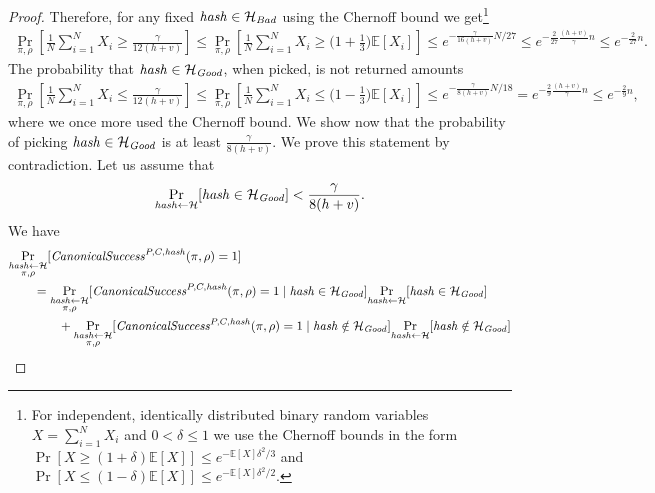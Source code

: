 \begin{proof}
Therefore, for any fixed $\operatorname{\mathit{hash}} \in \mathcal{H}_{\mathit{Bad}}$ using the Chernoff bound we get\footnote{For independent, identically distributed binary
random variables $X = \sum_{i=1}^N X_i$ and $0 < \delta \leq 1$ we use the Chernoff bounds in the form
$\Pr[X \geq (1+\delta) \mathbb{E}[X]] \leq e^{- \mathbb{E}[X] \delta^2/3}$ and
$\Pr[X \leq (1-\delta) \mathbb{E}[X]] \leq e^{- \mathbb{E}[X] \delta^2/2}$.}
\begin{align*}
  \underset{\pi,\rho}{\Pr} \left[\frac{1}{N} \sum_{i=1}^{N} X_i \geq \frac{\gamma}{12(h+v)} \right] \leq
  \underset{\pi, \rho}{\Pr}\left[\frac{1}{N} \sum_{i=1}^{N} X_i \geq \bigl(1 + \frac{1}{3}\bigr) \mathbb{E}[X_i]\right] \leq
  e^{-{\frac{\gamma}{16(h+v)}} N / 27} \leq e^{-\frac{2}{27}\frac{(h+v)}{\gamma}n} \leq e^{-\frac{2}{27}n}.
\end{align*}
%
The probability that $\operatorname{\mathit{hash}} \in \mathcal{H}_{\mathit{Good}}$, when picked, is not returned amounts
\begin{align*}
  \underset{\pi, \rho}{\Pr}\left[\frac{1}{N} \sum_{i=1}^{N} X_i \leq \frac{\gamma}{12(h+v)}\right] \leq
  \underset{\pi, \rho}{\Pr}\left[\frac{1}{N} \sum_{i=1}^{N} X_i \leq \bigl(1 - \frac{1}{3}\bigr)\mathbb{E}[X_i]\right]
  \leq e^{-{\frac{\gamma}{8(h+v)}} N / 18} = e^{-\frac{2}{9} \frac{(h+v)}{\gamma}n} \leq e^{-\frac{2}{9}n},
\end{align*}
where we once more used the Chernoff bound.
We show now that the probability of picking $\operatorname{\mathit{hash}} \in \mathcal{H}_{\mathit{Good}}$ is at least $\frac{\gamma}{8(h+v)}$.
We prove this statement by contradiction. Let us assume that
\begin{align}
  \label{ass:hash_max_prob}
\underset{\operatorname{\mathit{hash}} \leftarrow \mathcal{H}}{\Pr}[\operatorname{\mathit{hash}} \in \mathcal{H}_{\mathit{Good}}] < \frac{\gamma}{8(h+v)}.
\end{align}
We have
\begin{align*}
  &\underset{\substack{\hash \leftarrow \cH \\ \pi, \rho}}{\Pr}[\CanonicalSuccess^{P,C,\hash}(\pi, \rho) = 1] \\
  &\IndI = \underset{\substack{ \hash \leftarrow \cH \\ \pi, \rho}}{\Pr}[\CanonicalSuccess^{P,C,\hash}(\pi, \rho) = 1 \mid \hash \in \cH_{\mathit{Good}}]
  \underset{\hash \leftarrow \cH}{\Pr}[\hash \in \cH_{\mathit{Good}}] \\
  & \IndII + \underset{\substack{\hash \leftarrow \cH \\ \pi, \rho}}{\Pr}[\CanonicalSuccess^{P,C,\hash}(\pi, \rho) = 1 \mid \hash \notin \cH_{\mathit{Good}}]
  \underset{\hash \leftarrow \cH}{\Pr}[\hash \notin \cH_{\mathit{Good}}] \\

\end{align*}
\end{proof}

